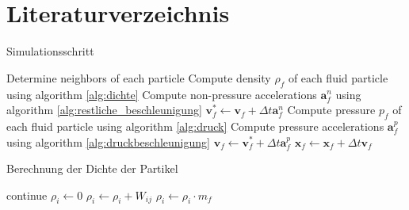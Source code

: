 \documentclass{scrreprt}
\begin{document}
\chapter{Literaturverzeichnis}



\begin{algorithm}
\caption{Simulationsschritt}
\label{alg:simulationsschritt}
\begin{algorithmic}[1]
    \STATE Determine neighbors of each particle
    \STATE Compute density $\rho_f$ of each fluid particle using algorithm \ref{alg:dichte}
    \STATE Compute non-pressure accelerations $\textbf{a}_f^n$ using algorithm \ref{alg:restliche_beschleunigung}
        \STATE $\textbf{v}_f^* \gets \textbf{v}_f + \Delta t \textbf{a}_f^n$
    \ENDFOR
    \STATE Compute pressure $p_f$ of each fluid particle using algorithm \ref{alg:druck}
    \STATE Compute pressure accelerations $\textbf{a}_f^p$ using algorithm \ref{alg:druckbeschleunigung}
        \STATE $\textbf{v}_f \gets \textbf{v}_f^* + \Delta t \textbf{a}_f^p$
    \ENDFOR
        \STATE $\textbf{x}_f \gets \textbf{x}_f + \Delta t \textbf{v}_f$
    \ENDFOR
    \STATE 
\end{algorithmic}
\end{algorithm}

\begin{algorithm}
\caption{Berechnung der Dichte der Partikel}
\label{alg:dichte}
\begin{algorithmic}
            \STATE continue
        \ENDIF
        \STATE $\rho_i \gets 0$
            \STATE $\rho_i \gets \rho_i + W_{ij}$
        \ENDFOR
        \STATE $\rho_i \gets \rho_i \cdot m_f$
    \ENDFOR
\end{algorithmic}
\end{algorithm}
\end{document}
